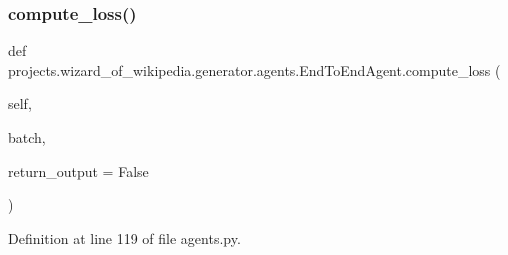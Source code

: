 \subsubsection{\texorpdfstring{compute\+\_\+loss()}{compute\_loss()}}
{\footnotesize\ttfamily def projects.\+wizard\+\_\+of\+\_\+wikipedia.\+generator.\+agents.\+End\+To\+End\+Agent.\+compute\+\_\+loss (\begin{DoxyParamCaption}\item[{}]{self,  }\item[{}]{batch,  }\item[{}]{return\+\_\+output = {\ttfamily False} }\end{DoxyParamCaption})}



Definition at line 119 of file agents.\+py.


